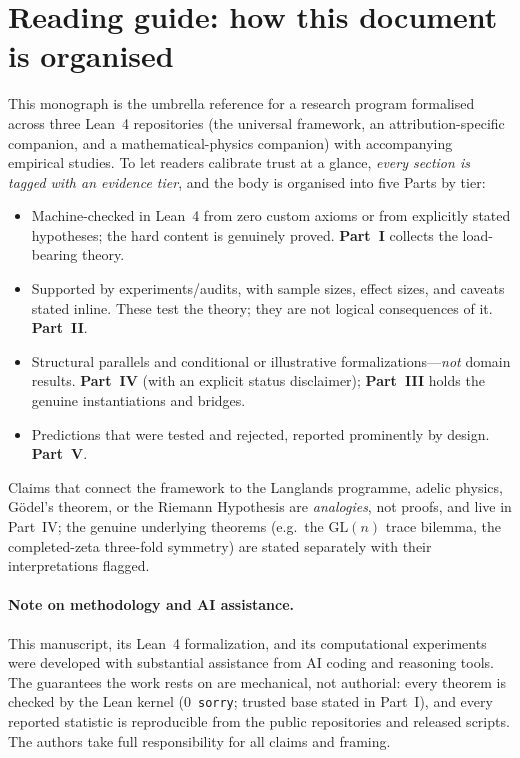 \documentclass[11pt,a4paper]{article}
\begin{document}
\section*{Reading guide: how this document is organised}
This monograph is the umbrella reference for a research program formalised across
three Lean~4 repositories (the universal framework, an attribution-specific
companion, and a mathematical-physics companion) with accompanying empirical
studies. To let readers calibrate trust at a glance, \emph{every section is tagged
with an evidence tier}, and the body is organised into five Parts by tier:
\begin{itemize}
  \item[\textbf{Tier A --- Hardened.}] Machine-checked in Lean~4 from zero custom
    axioms or from explicitly stated hypotheses; the hard content is genuinely
    proved. \textbf{Part~I} collects the load-bearing theory.
  \item[\textbf{Tier B --- Empirical.}] Supported by experiments/audits, with sample
    sizes, effect sizes, and caveats stated inline. These test the theory; they are
    not logical consequences of it. \textbf{Part~II}.
  \item[\textbf{Tier C --- Speculative / analogical.}] Structural parallels and
    conditional or illustrative formalizations---\emph{not} domain results.
    \textbf{Part~IV} (with an explicit status disclaimer); \textbf{Part~III} holds the
    genuine instantiations and bridges.
  \item[\textbf{Tier D --- Falsified / boundary.}] Predictions that were tested and
    rejected, reported prominently by design. \textbf{Part~V}.
\end{itemize}
Claims that connect the framework to the Langlands programme, adelic physics,
G\"odel's theorem, or the Riemann Hypothesis are \emph{analogies}, not proofs, and
live in Part~IV; the genuine underlying theorems (e.g.\ the $\mathrm{GL}(n)$ trace
bilemma, the completed-zeta three-fold symmetry) are stated separately with their
interpretations flagged.

\paragraph{Note on methodology and AI assistance.}
This manuscript, its Lean~4 formalization, and its computational experiments were
developed with substantial assistance from AI coding and reasoning tools. The
guarantees the work rests on are mechanical, not authorial: every theorem is
checked by the Lean kernel (0~\texttt{sorry}; trusted base stated in Part~I), and
every reported statistic is reproducible from the public repositories and released
scripts. The authors take full responsibility for all claims and framing.
\end{document}
